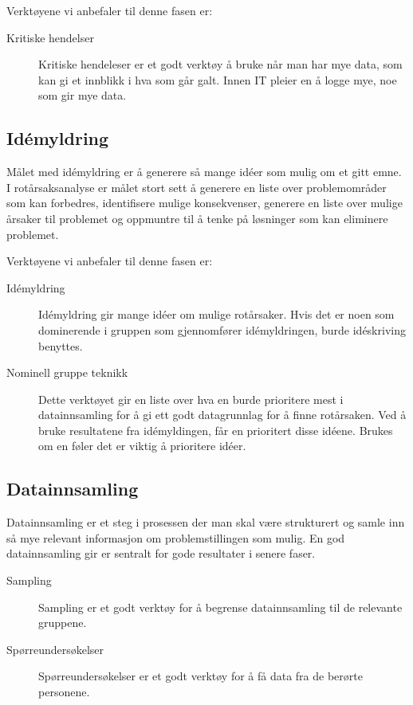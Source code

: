 Verktøyene vi anbefaler til denne fasen er: 
\begin{description}
    \item[Kritiske hendelser] Kritiske hendeleser er et godt verktøy å bruke når man har mye data, som kan gi et innblikk i hva som går galt. Innen IT pleier en å logge mye, noe som gir mye data.
\end{description}

\subsection{Idémyldring}
Målet med idémyldring er å generere så mange idéer som mulig om et gitt emne. I rotårsaksanalyse er målet stort sett å generere en liste over problemområder som kan forbedres, identifisere mulige konsekvenser, generere en liste over mulige årsaker til problemet og oppmuntre til å tenke på løsninger som kan eliminere problemet. 

Verktøyene vi anbefaler til denne fasen er:
\begin{description}
    \item[Idémyldring] Idémyldring gir mange idéer om mulige rotårsaker. Hvis det er noen som dominerende i gruppen som gjennomfører idémyldringen, burde idéskriving benyttes.
    \item[Nominell gruppe teknikk] Dette verktøyet gir en liste over hva en burde prioritere mest i datainnsamling for å gi ett godt datagrunnlag for å finne rotårsaken. Ved å bruke resultatene fra idémyldingen, får en prioritert disse idéene. Brukes om en føler det er viktig å prioritere idéer.
\end{description}

\subsection{Datainnsamling}
Datainnsamling er et steg i prosessen der man skal være strukturert og samle inn så mye relevant informasjon om problemstillingen som mulig. En god datainnsamling gir er sentralt for gode resultater i senere faser.


\begin{description}
    \item[Sampling] Sampling er et godt verktøy for å begrense datainnsamling til de relevante gruppene. 
    \item[Spørreundersøkelser] Spørreundersøkelser er et godt verktøy for å få data fra de berørte personene. 
\end{description}

